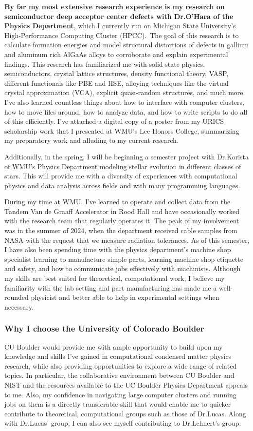 \documentclass[11pt]{article}
\newcommand{\school}{University of Colorado Boulder}
\newcommand{\schoolabbr}{CU Boulder}
\begin{document}
\textbf{By far my most extensive research experience is my research on semiconductor deep acceptor center defects with Dr.\@ O'Hara of the Physics Department}, which I currently run on Michigan State University's High-Performance Computing Cluster (HPCC).\ The goal of this research is to calculate formation energies and model structural distortions of defects in gallium and aluminum rich AlGaAs alloys to corroborate and explain experimental findings. This research has familiarized me with solid state physics, semiconductors, crystal lattice structures, density functional theory, VASP, different functionals like PBE and HSE, alloying techniques like the virtual crystal approximation (VCA), explicit quasi-random structures, and much more. I've also learned countless things about how to interface with computer clusters, how to move files around, how to analyze data, and how to write scripts to do all of this efficiently. I've attached a digital copy of a poster from my URICS scholarship work that I presented at WMU's Lee Honors College, summarizing my preparatory work and alluding to my current research.

Additionally, in the spring, I will be beginning a semester project with Dr.\@ Korista of WMU's Physics Department modeling stellar evolution in different classes of stars. This will provide me with a diversity of experiences with computational physics and data analysis across fields and with many programming languages.

During my time at WMU, I've learned to operate and collect data from the Tandem Van de Graaff Accelerator in Rood Hall and have occasionally worked with the research team that regularly operates it. The peak of my involvement was in the summer of 2024, when the department received cable samples from NASA with the request that we measure radiation tolerances. As of this semester, I have also been spending time with the physics department's machine shop specialist learning to manufacture simple parts, learning machine shop etiquette and safety, and how to communicate jobs effectively with machinists. Although my skills are best suited for theoretical, computational work, I believe my familiarity with the lab setting and part manufacturing has made me a well-rounded physicist and better able to help in experimental settings when necessary.

\subsubsection*{Why I choose the \school{}}
\schoolabbr{} would provide me with ample opportunity to build upon my knowledge and skills I've gained in computational condensed matter physics research, while also providing opportunities to explore a wide range of related topics. In particular, the collaborative environment between \schoolabbr{} and NIST and the resources available to the UC Boulder Physics Department appeals to me. Also, my confidence in navigating large computer clusters and running jobs on them is a directly transferable skill that would enable me to quicker contribute to theoretical, computational groups such as those of Dr.\@ Lucas. Along with Dr.\@ Lucas' group, I can also see myself contributing to Dr.\@ Lehnert's group.
\end{document}
